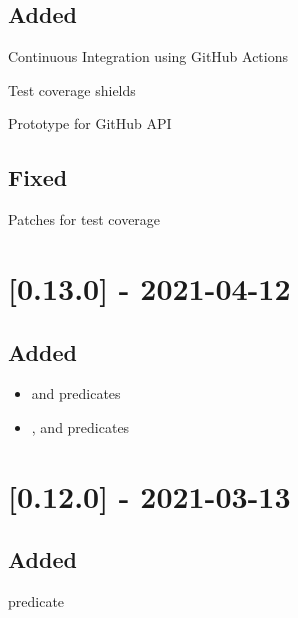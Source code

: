 \subsection{Added}

\begin{shortlist}
    \item Continuous Integration using GitHub Actions
    \item Test coverage shields
    \item Prototype for GitHub API
\end{shortlist}

\subsection{Fixed}

\begin{shortlist}
    \item Patches for test coverage
\end{shortlist}

\section{[0.13.0] - 2021-04-12}

\subsection{Added}

\begin{itemize}
    \item {} and  predicates
    \item {},  and  predicates
\end{itemize}

\section{[0.12.0] - 2021-03-13}

\subsection{Added}

\begin{shortlist}
    \item {} predicate
\end{shortlist}

